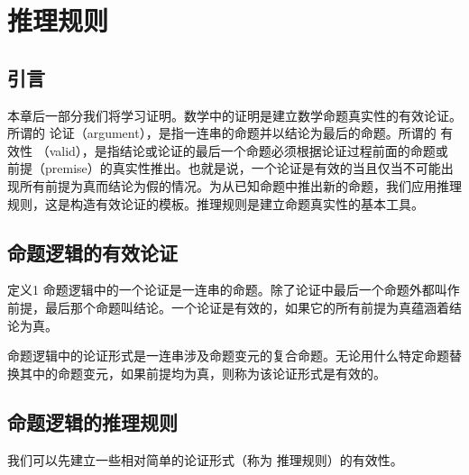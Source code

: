 \section{推理规则}
\subsection{引言}
本章后一部分我们将学习证明。数学中的证明是建立数学命题真实性的有效论证。所谓的 论证（argument），是指一连串的命题并以结论为最后的命题。所谓的 有效性 （valid），是指结论或论证的最后一个命题必须根据论证过程前面的命题或 前提（premise）的真实性推出。也就是说，一个论证是有效的当且仅当不可能出现所有前提为真而结论为假的情况。为从已知命题中推出新的命题，我们应用推理规则，这是构造有效论证的模板。推理规则是建立命题真实性的基本工具。
\subsection{命题逻辑的有效论证}

定义1  命题逻辑中的一个论证是一连串的命题。除了论证中最后一个命题外都叫作前提，最后那个命题叫结论。一个论证是有效的，如果它的所有前提为真蕴涵着结论为真。

命题逻辑中的论证形式是一连串涉及命题变元的复合命题。无论用什么特定命题替换其中的命题变元，如果前提均为真，则称为该论证形式是有效的。

\subsection{命题逻辑的推理规则}
我们可以先建立一些相对简单的论证形式（称为 推理规则）的有效性。

